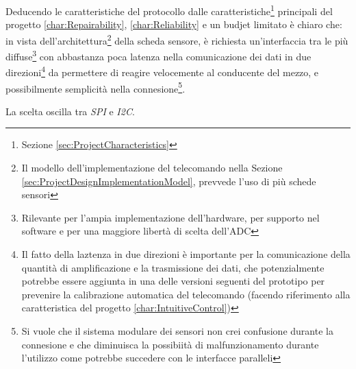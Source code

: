 \documentclass[a4paper, 10pt, final]{article} %
\begin{document}
    Deducendo le caratteristiche del protocollo dalle caratteristiche\footnote{Sezione \ref{sec:ProjectCharacteristics}} principali del progetto \ref{char:Repairability}, \ref{char:Reliability} e un budjet limitato \`{e} chiaro che: in vista dell'architettura\footnote{Il modello dell'implementazione del telecomando nella Sezione \ref{sec:ProjectDesignImplementationModel}, prevvede l'uso di pi\`{u} schede sensori} della scheda sensore, \`{e} richiesta un'interfaccia tra le pi\`{u} diffuse\footnote{Rilevante per l'ampia implementazione dell'hardware, per supporto nel software e per una maggiore libert\`{a} di scelta dell'ADC} con abbastanza poca latenza nella comunicazione dei dati in due direzioni\footnote{Il fatto della laztenza in due direzioni \`{e} importante per la comunicazione della quantit\`{a} di amplificazione e la trasmissione dei dati, che potenzialmente potrebbe essere aggiunta in una delle versioni seguenti del prototipo per prevenire la calibrazione automatica del telecomando (facendo riferimento alla caratteristica del progetto \ref{char:IntuitiveControl})} da permettere di reagire velocemente al conducente del mezzo, e possibilmente semplicit\`{a} nella connesione\footnote{Si vuole che il sistema modulare dei sensori non crei confusione durante la connesione e che diminuisca la possibiit\`{a} di malfunzionamento durante l'utilizzo come potrebbe succedere con le interfacce paralleli}.

    \vspace{2ex}
    \Centering
    La scelta oscilla tra \emph{SPI} e \emph{I2C}.

    \vspace{2ex}
    \justifying
\end{document}
